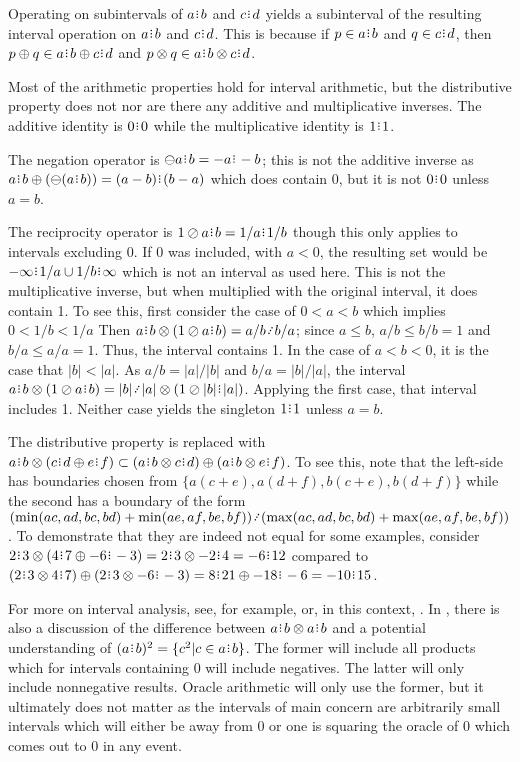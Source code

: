 \documentclass[12pt]{article}
\begin{document}
 Operating on subintervals of $a\rint b$ and $c\rint d$ yields a subinterval of the resulting interval operation on $a\rint b$ and $c\rint d$. This is because if $p \in a\rint b$ and $q \in c\rint d$, then $p \oplus q \in a\rint b \oplus c\rint d$ and $p \otimes q \in a\rint b \otimes c\rint d$. 

Most of the arithmetic properties hold for interval arithmetic, but the distributive property does not nor are there any additive and multiplicative inverses. The additive identity is $0\rint 0$ while the multiplicative identity is $1\rint 1$.

The negation operator is $\ominus a\rint b  = -a\rint -b$; this is not the additive inverse as $a\rint b \oplus (\ominus(a \rint b )) = (a-b)\rint (b-a)$ which does contain 0, but it is not $0\rint 0$ unless $a = b$. 

The reciprocity operator is $1 \oslash a\rint b = 1/a \rint  1/b$ though this only applies to intervals excluding 0. If 0 was included, with $a < 0$, the resulting set would be $-\infty\rint 1/a \cup 1/b \rint  \infty $ which is not an interval as used here. This is not the multiplicative inverse, but when multiplied with the original interval, it does contain 1. To see this, first consider the case of $0 \lt a \lt b$ which implies $0 \lt 1/b \lt 1/a$ Then $a\rint b \otimes (1 \oslash a\rint b) = a/b \lte b/a$; since $a \leq b$, $a /b \leq b/b =1 $ and $b/a \leq a/a = 1$. Thus, the interval contains 1. In the case of $a \lt b \lt 0$, it is the case that $|b| < |a|$. As $a/b = |a|/|b|$ and $b/a = |b|/|a|$, the interval $a\rint b \otimes (1 \oslash a\rint b) = |b| \lte |a| \otimes (1 \oslash |b|\rint |a|)$. Applying the first case, that interval includes 1. Neither case yields the singleton $1\rint 1$ unless $a=b$. 

The distributive property is replaced with $ a\rint b \otimes ( c\rint d \oplus e\rint f) \subset (a\rint b \otimes c\rint d) \oplus (a\rint b \otimes e\rint f)$. To see this, note that the left-side has boundaries chosen from $\{a(c+e), a(d+f), b(c+e), b(d+f)\}$ while the second has a boundary of the form $(\min(ac, ad, bc, bd) + \min(ae, af, be, bf) ) \lte (\max(ac, ad, bc, bd) + \max(ae, af, be, bf) )$. To demonstrate that they are indeed not equal for some examples, consider $2\rint 3 \otimes ( 4\rint 7 \oplus -6\rint -3) = 2\rint 3 \otimes -2\rint 4 = -6\rint 12$ compared to $(2\rint 3 \otimes 4\rint 7) \oplus (2\rint 3 \otimes -6\rint -3) = 8\rint 21 \oplus -18\rint -6 = -10\rint 15$. 

For more on interval analysis, see, for example, \cite{moore} or, in this context, \cite{taylor23main}. In \cite{moore}, there is also a discussion of the difference between $a\rint b \otimes a\rint b$ and a potential understanding of $(a\rint b)^2 = \{c^2 | c \in a\rint b\}$. The former will include all products which for intervals containing 0 will include negatives. The latter will only include nonnegative results. Oracle arithmetic will only use the former, but it ultimately does not matter as the intervals of main concern are arbitrarily small intervals which will either be away from 0 or one is squaring the oracle of 0 which comes out to 0 in any event.  
\end{document}
